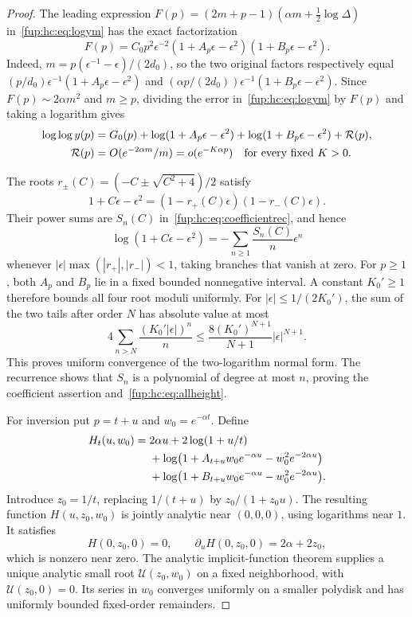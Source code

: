 \documentclass[11pt,letterpaper]{article}
\theoremstyle{definition}\newtheorem{definition}[theorem]{Definition}
\theoremstyle{remark}\newtheorem{remark}[theorem]{Remark}
\begin{document}
\begin{proof}
The leading expression $F(p)=(2m+p-1)(\alpha m+\tfrac12\log\Delta)$ in~\eqref{fup:hc:eq:logym} has the exact factorization
\begin{equation}\label{fup:hc:eq:factorization}
 F(p)=C_0p^2\epsilon^{-2}
       (1+A_p\epsilon-\epsilon^2)(1+B_p\epsilon-\epsilon^2).
\end{equation}
Indeed, $m=p(\epsilon^{-1}-\epsilon)/(2d_0)$, so the two original factors respectively equal $(p/d_0)\epsilon^{-1}(1+A_p\epsilon-\epsilon^2)$ and $(\alpha p/(2d_0))\epsilon^{-1}(1+B_p\epsilon-\epsilon^2)$. Since $F(p)\sim2\alpha m^2$ and $m\ge p$, dividing the error in~\eqref{fup:hc:eq:logym} by $F(p)$ and taking a logarithm gives
\begin{align}\label{fup:hc:eq:normalform}
 \log\log y(p)&=G_0(p)+\log(1+A_p\epsilon-\epsilon^2)
                  +\log(1+B_p\epsilon-\epsilon^2)+\mathcal R(p),\notag\\
 \mathcal R(p)&=O(e^{-2\alpha m}/m)=o(e^{-K\alpha p})
                                  \quad\text{for every fixed }K>0.
\end{align}

The roots $r_\pm(C)=(-C\pm\sqrt{C^2+4})/2$ satisfy
\[
 1+C\epsilon-\epsilon^2=(1-r_+(C)\epsilon)(1-r_-(C)\epsilon).
\]
Their power sums are $S_n(C)$ in~\eqref{fup:hc:eq:coefficientrec}, and hence
\[
 \log(1+C\epsilon-\epsilon^2)
       =-\sum_{n\ge1}\frac{S_n(C)}n\epsilon^n
\]
whenever $|\epsilon|\max(|r_+|,|r_-|)<1$, taking branches that vanish at zero. For $p\ge1$, both $A_p$ and $B_p$ lie in a fixed bounded nonnegative interval. A constant $K_0'\ge1$ therefore bounds all four root moduli uniformly. For $|\epsilon|\le1/(2K_0')$, the sum of the two tails after order $N$ has absolute value at most
\[
 4\sum_{n>N}\frac{(K_0'|\epsilon|)^n}{n}
 \le\frac{8(K_0')^{N+1}}{N+1}|\epsilon|^{N+1}.
\]
This proves uniform convergence of the two-logarithm normal form. The recurrence shows that $S_n$ is a polynomial of degree at most $n$, proving the coefficient assertion and~\eqref{fup:hc:eq:allheight}.

For inversion put $p=t+u$ and $w_0=e^{-\alpha t}$. Define
\begin{align}\label{fup:hc:eq:Hnormal}
 H_t(u,w_0)={}&2\alpha u+2\log(1+u/t)\notag\\
 &+\log\bigl(1+A_{t+u}w_0e^{-\alpha u}-w_0^2e^{-2\alpha u}\bigr)\notag\\
 &+\log\bigl(1+B_{t+u}w_0e^{-\alpha u}-w_0^2e^{-2\alpha u}\bigr).
\end{align}
Introduce $z_0=1/t$, replacing $1/(t+u)$ by $z_0/(1+z_0u)$. The resulting function $H(u,z_0,w_0)$ is jointly analytic near $(0,0,0)$, using logarithms near $1$. It satisfies
\[
 H(0,z_0,0)=0,\qquad \partial_uH(0,z_0,0)=2\alpha+2z_0,
\]
which is nonzero near zero. The analytic implicit-function theorem supplies a unique analytic small root $\mathcal U(z_0,w_0)$ on a fixed neighborhood, with $\mathcal U(z_0,0)=0$. Its series in $w_0$ converges uniformly on a smaller polydisk and has uniformly bounded fixed-order remainders.


\end{proof}
\end{document}
